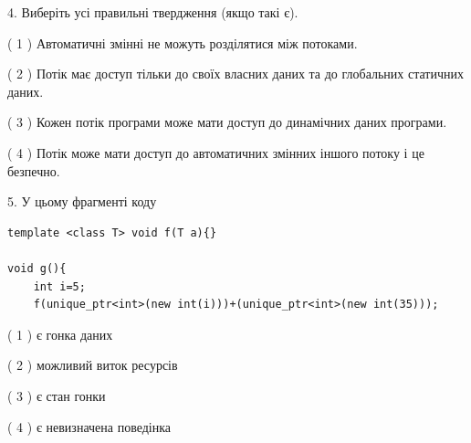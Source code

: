 \documentclass[12pt, ukrainian]{article}
\begin{document}
\begin {large}
{%
4. Виберіть усі правильні твердження (якщо такі є).\par
\vspace{2mm}

( 1 ) Автоматичні змінні не можуть розділятися між потоками.%

( 2 ) Потік має доступ тільки до своїх власних даних та до глобальних статичних даних.%

( 3 ) Кожен потік програми може мати доступ до динамічних даних програми.%

( 4 ) Потік може мати доступ до автоматичних змінних іншого потоку і це безпечно.%


5. У цьому фрагменті коду
\begin{verbatim}
template <class T> void f(T a){}

void g(){
    int i=5;
    f(unique_ptr<int>(new int(i)))+(unique_ptr<int>(new int(35)));
\end{verbatim}
( 1 ) є гонка даних%

( 2 ) можливий виток ресурсів%

( 3 ) є стан гонки%

( 4 ) є невизначена поведінка%
}
\end {large}
\end{document}
